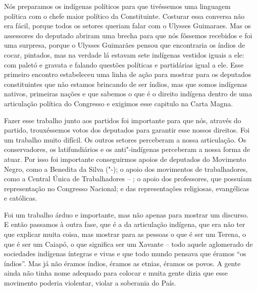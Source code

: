 Nós preparamos os indígenas políticos para que tivéssemos uma linguagem
política com o chefe maior político da Constituinte. Costurar essa
conversa não era fácil, porque todos os setores queriam falar com o
Ulysses Guimaraes. Mas os assessores do deputado abriram uma brecha para
que nós fôssemos recebidos e foi uma surpresa, porque o Ulysses
Guimarães pensou que encontraria os índios de cocar, pintados, mas na
verdade lá estavam sete indígenas vestidos iguais a ele: com paletó e
gravata e falando questões políticas e partidárias igual a ele. Esse
primeiro encontro estabeleceu uma linha de ação para mostrar para os
deputados constituintes que não estamos brincando de ser índios, mas que
somos indígenas nativos, primeiras nações e que sabemos o que é o
direito indígena dentro de uma articulação política do Congresso e
exigimos esse capitulo na Carta Magna.

Fazer esse trabalho junto aos partidos foi importante para que nós,
através do partido, trouxéssemos votos dos deputados para garantir esse
nossos direitos. Foi um trabalho muito difícil. Os outros setores
perceberam a nossa articulação. Os conservadores, os latifundiários e os
anti"-indígenas perceberam a nossa forma de atuar. Por isso foi
importante conseguirmos apoios de deputados do Movimento Negro, como a
Benedita da Silva ("-); o apoio dos movimentos de trabalhadores, como
a Central Única de Trabalhadores -- ; o apoio dos professores, que
possuíam representação no Congresso Nacional; e das representações
religiosas, evangélicas e católicas.

Foi um trabalho árduo e importante, mas não apenas para mostrar um
discurso. E então passamos à outra fase, que é a da articulação
indígena, que era não ter que explicar muita coisa, mas mostrar para as
pessoas o que é ser um Terena, o que é ser um Caiapó, o que significa
ser um Xavante -- todo aquele aglomerado de sociedades indígenas
íntegras e vivas e que todo mundo pensava que éramos ``os índios''. Mas
já não éramos índios, éramos as etnias, éramos os povos. A gente ainda
não tinha nome adequado para colocar e muita gente dizia que esse
movimento poderia violentar, violar a soberania do País.

